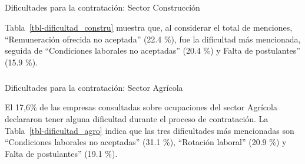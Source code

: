 \documentclass[
  14pt,
]{article}
\makeatletter
\let\oldsubparagraph\subparagraph
\renewcommand{\subparagraph}{
    \@ifstar
      \xxxSubParagraphStar
      \xxxSubParagraphNoStar
  }
\newcommand{\xxxSubParagraphStar}[1]{\oldsubparagraph*{#1}\mbox{}}
\newcommand{\xxxSubParagraphNoStar}[1]{\oldsubparagraph{#1}\mbox{}}
\makeatother
\begin{document}
\subparagraph{Dificultades para la contratación: Sector
Construcción}\label{dificultades-para-la-contrataciuxf3n-sector-construcciuxf3n}

Tabla~\ref{tbl-dificultad_constru} muestra que, al considerar el total
de menciones, ``Remuneración ofrecida no aceptada'' (22.4 \%), fue la
dificultad más mencionada, seguida de ``Condiciones laborales no
aceptadas'' (20.4 \%) y Falta de postulantes'' (15.9 \%).

\begin{table}

\caption{\label{tbl-dificultad_constru}Dificultades principales de
contratación, ocupaciones del sector Construcción.}


\end{table}%

\subparagraph{Dificultades para la contratación: Sector
Agrícola}\label{dificultades-para-la-contrataciuxf3n-sector-agruxedcola}

El 17,6\% de las empresas consultadas sobre ocupaciones del sector
Agrícola declararon tener alguna dificultad durante el proceso de
contratación. La Tabla~\ref{tbl-dificultad_agro} indica que las tres
dificultades más mencionadas son ``Condiciones laborales no aceptadas''
(31.1 \%), ``Rotación laboral'' (20.9 \%) y Falta de postulantes'' (19.1
\%).
\end{document}
